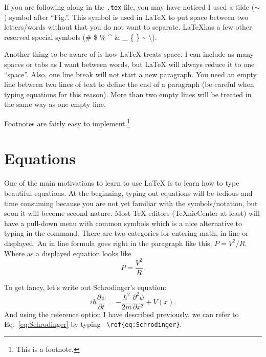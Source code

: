 \documentclass[11pt,letterpaper]{article} %
\begin{document}
If you are following along in the \texttt{.tex} file, you may have noticed I used a tilde ($\sim$) symbol after ``Fig.''. This symbol is used in \LaTeX{} to put space between two letters/words without that you do not want to separate. \LaTeX has a few other reserved special symbols (\# \$ \% \^{} \& \_ \{ \} \~{} \textbackslash).


Another thing to be aware of is how \LaTeX{} treats space. I can include as many spaces or tabs     as I want between			words, but \LaTeX{} will always reduce it to one ``space''. Also,
one line break will not start a new paragraph. You need an empty line between two lines of text to define the end of a paragraph (be careful when typing equations for this reason). More than two empty lines will be treated in the same way as one empty line.

Footnotes are fairly easy to implement.\footnote{This is a footnote.}

\section{Equations}

One of the main motivations to learn to use \LaTeX{} is to learn how to type beautiful equations. At the beginning, typing out equations will be tedious and time consuming because you are not yet familiar with the symbols/notation, but soon it will become second nature. Most TeX editors (TeXnicCenter at least) will have a pull-down menu with common symbols which is a nice alternative to typing in the command. There are two categories for entering math, in line or displayed. An in line formula goes right in the paragraph like this, $P = V^{2}/R$. Where as a displayed equation looks like
\begin{equation} %
P = \frac{V^{2}}{R}. %
\label{eq:decay} %
\end{equation} %

To get fancy, %
let's write out Schrodinger's equation:
\begin{equation}
     i\hbar \frac{\partial \psi}{\partial t} = -\frac{\hbar^{2}} {2m} 	\frac{\partial^{2} \psi}{\partial x^{2}} + V(x).
     \label{eq:Schrodinger}%
\end{equation}
And using the reference option I have described previously, we can refer to Eq.~\ref{eq:Schrodinger} by typing \linebreak \verb| \ref{eq:Schrodinger}|. 
\end{document}
